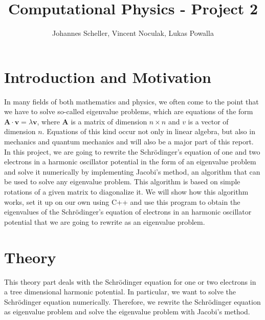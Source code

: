 \documentclass[10pt,a4paper]{article}
\author{Johannes Scheller, Vincent Noculak, Lukas Powalla}
\title{Computational Physics - Project 2}
\begin{document}
\maketitle
\newpage
\tableofcontents
\newpage
\section{Introduction and Motivation}
In many fields of both mathematics and physics, we often come to the point that we have to solve so-called eigenvalue problems, which are equations of the form $\mathbf{A}\cdot\mathbf{v}=\lambda\mathbf{v}$, where $\mathbf{A}$ is a matrix of dimension $n\times n$ and $v$ is a vector of dimension $n$. Equations of this kind occur not only in linear algebra, but also in mechanics and quantum mechanics and will also be a major part of this report. In this project, we are going to rewrite the Schrödinger's equation of one and two electrons in a harmonic oscillator potential in the form of an eigenvalue problem and solve it numerically by implementing Jacobi's method, an algorithm that can be used to solve any eigenvalue problem. This algorithm is based on simple rotations of a given matrix to diagonalize it. We will show how this algorithm works, set it up on our own using C++ and use this program to obtain the eigenvalues of the Schrödinger's equation of electrons in an harmonic oscillator potential that we are going to rewrite as an eigenvalue problem.

\section{Theory}
This theory part deals with the Schrödinger equation for one or two electrons in a tree dimensional harmonic potential. In particular, we want to solve the Schrödinger equation numerically. Therefore, we rewrite the Schrödinger equation as eigenvalue problem and solve the eigenvalue problem with Jacobi's method. 
\end{document}
